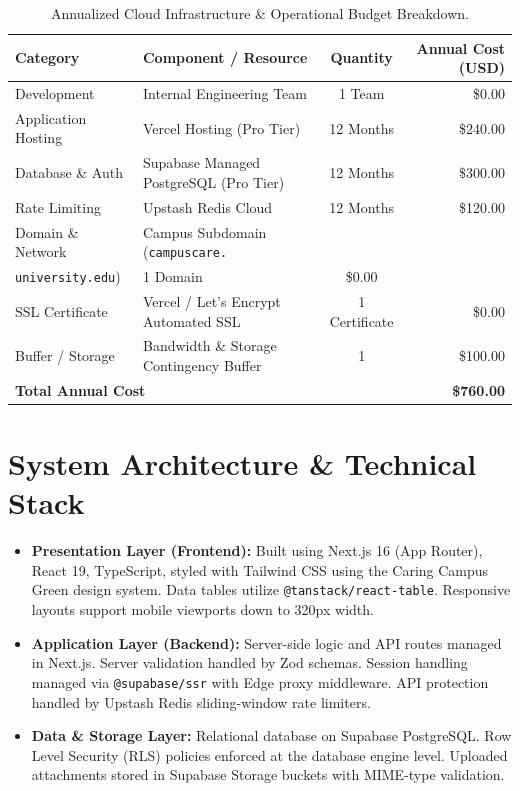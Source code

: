 \documentclass[12pt, a4paper]{article}
\begin{document}
\begin{table}[H]
\centering
\small
\begin{tabularx}{\textwidth}{p{} X c r}
\toprule
\textbf{Category} & \textbf{Component / Resource} & \textbf{Quantity} & \textbf{Annual Cost (USD)} \\
\midrule
Development & Internal Engineering Team & 1 Team & \$0.00 \\
Application Hosting & Vercel Hosting (Pro Tier) & 12 Months & \$240.00 \\
Database \& Auth & Supabase Managed PostgreSQL (Pro Tier) & 12 Months & \$300.00 \\
Rate Limiting & Upstash Redis Cloud & 12 Months & \$120.00 \\
Domain \& Network & Campus Subdomain (\texttt{campuscare.}\\ \texttt{university.edu}) & 1 Domain & \$0.00 \\
SSL Certificate & Vercel / Let's Encrypt Automated SSL & 1 Certificate & \$0.00 \\
Buffer / Storage & Bandwidth \& Storage Contingency Buffer & 1 & \$100.00 \\
\midrule
\multicolumn{3}{l}{\textbf{Total Annual Cost}} & \textbf{\$760.00} \\
\bottomrule
\end{tabularx}
\caption{Annualized Cloud Infrastructure \& Operational Budget Breakdown.}
\end{table}

\section{System Architecture \& Technical Stack}

\begin{itemize}[leftmargin=*]
    \item \textbf{Presentation Layer (Frontend):} Built using Next.js 16 (App Router), React 19, TypeScript, styled with Tailwind CSS using the Caring Campus Green design system. Data tables utilize \texttt{@tanstack/react-table}. Responsive layouts support mobile viewports down to 320px width.
    \item \textbf{Application Layer (Backend):} Server-side logic and API routes managed in Next.js. Server validation handled by Zod schemas. Session handling managed via \texttt{@supabase/ssr} with Edge proxy middleware. API protection handled by Upstash Redis sliding-window rate limiters.
    \item \textbf{Data \& Storage Layer:} Relational database on Supabase PostgreSQL. Row Level Security (RLS) policies enforced at the database engine level. Uploaded attachments stored in Supabase Storage buckets with MIME-type validation.
\end{itemize}
\end{document}

